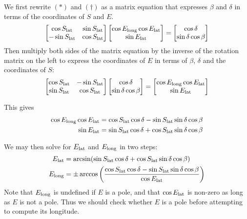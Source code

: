 \documentclass[12pt]{article}
\newcommand\lat[1]{{#1}_{\rm lat}}
\renewcommand\long[1]{{#1}_{\rm long}}
\begin{document}
We first rewrite $(\ast)$ and $(\dagger)$ as a matrix equation that expresses
$\beta$ and $\delta$ in terms of the coordinates of $S$ and $E$.
$$
  \left[
  \begin{matrix}
   \cos\lat S  & \sin\lat S \\
   -\sin\lat S & \cos\lat S
  \end{matrix}
  \right]
  \left[
   \begin{matrix}
    \cos\long E\cos\lat E \\
    \sin\lat E
   \end{matrix}
  \right]
  = \left[
    \begin{matrix}
    \cos\delta \\
    \sin\delta\cos\beta \\
    \end{matrix}
  \right]
$$
Then multiply both sides of the matrix equation by the inverse of the rotation
matrix on the left to express the coordinates of $E$ in terms of $\beta$,
$\delta$ and the coordinates of $S$:
$$
  \left[
  \begin{matrix}
   \cos\lat S  & -\sin\lat S \\
   \sin\lat S & \cos\lat S
  \end{matrix}
  \right]
  \left[
   \begin{matrix}
    \cos\delta\\
    \sin\delta\cos\beta
   \end{matrix}
  \right]
  = \left[
    \begin{matrix}
    \cos\long E\cos\lat E \\
    \sin\lat E \\
    \end{matrix}
  \right]
$$

This gives
\begin{align*}
  \cos\long E\cos\lat E &= \cos\lat S\cos\delta -
                          \sin\lat S\sin\delta\cos\beta\\
  \sin\lat E &= \sin\lat S\cos\delta + \cos\lat S\sin\delta\cos\beta
\end{align*}

We may then solve for $\lat E$ and $\long E$ in two steps:
\begin{align*}
  \lat E &= \arcsin(\sin\lat S\cos\delta + \cos\lat S\sin\delta\cos\beta)\\
  \long E &=\pm\arccos
            \left(
            \frac{\cos\lat S\cos\delta-\sin\lat S\sin\delta\cos\beta}{\cos\lat E}
            \right)
\end{align*}
Note that $\long E$ is undefined if $E$ is a pole, and that $\cos\lat E$ is
non-zero as long as $E$ is not a pole.  Thus we should check whether $E$
is a pole before attempting to compute its longitude.
\end{document}
